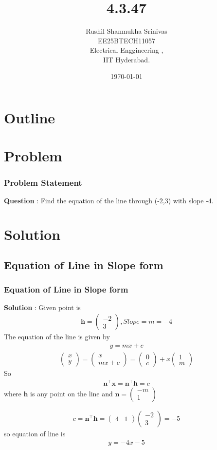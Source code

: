 \documentclass{beamer}
\title{4.3.47}
\author{Rushil Shanmukha Srinivas \\EE25BTECH11057 \\ Electrical Enggineering ,\\IIT Hyderabad.}
\date{\today}
\theoremstyle{remark}
\newcommand{\myvec}[1]{\ensuremath{\begin{pmatrix}#1\end{pmatrix}}}
\let\vec\mathbf
\numberwithin{equation}{section}
\begin{document}
 

\begin{frame}
\titlepage
\end{frame}

\section*{Outline}
\begin{frame}
\tableofcontents
\end{frame}
\section{Problem}
\begin{frame}
\frametitle{Problem Statement}
\textbf{Question} : Find the equation of the line through (-2,3) with slope -4.
\end{frame}
\section{Solution}
\subsection{Equation of Line in Slope form}
\begin{frame}
\frametitle{Equation of Line in Slope form}
\textbf{Solution} :
Given point is 
\begin{align}
\vec{h}=\myvec
{-2\\3} , Slope=m=-4
\end{align}
The equation of the line is given by
\begin{align}
y=mx+c
\end{align}
\begin{align}
\myvec{x\\y} = \myvec{x\\mx+c}=\myvec{0\\c} + x\myvec{1\\m}
\end{align}
So
\begin{align}
\vec{n}^\top \vec{x} = \vec{n}^\top \vec{h} =c
\end{align}
 where $\vec{h}$ is any point on the line and $\vec{n}=\myvec{-m\\1} $
\end{frame}
\begin{frame}
\begin{align}
c = \vec{n}^\top \vec{h} = \myvec{4 & 1}\myvec{-2\\3} = -5
\end{align}
so equation of line is 
\begin{align}
y=-4x -5 
\end{align}
 
\end{frame}
\end{document}
